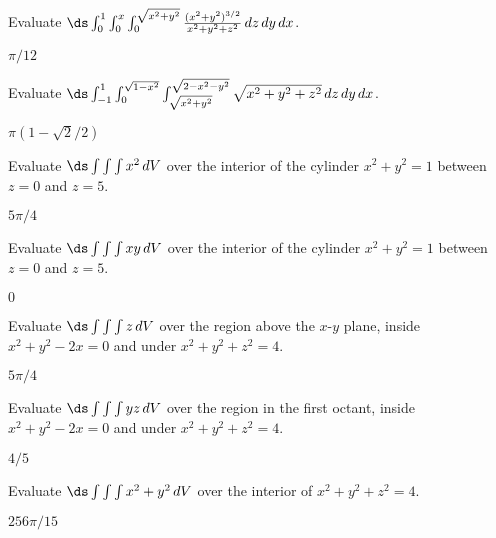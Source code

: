 \begin{exercises}

\begin{exercise} Evaluate $\ds\int_{0}^{1}\int_{0}^{x}\int_{0}^{\sqrt{x^2+y^2}}
{(x^2+y^2)^{3/2}\over x^2+y^2+z^2}\,dz\,dy\,dx$.
\begin{answer} $\pi/12$
\end{answer}\end{exercise}

\begin{exercise} Evaluate $\ds\int_{-1}^{1}\int_{0}^{\sqrt{1-x^2}}
\int_{\sqrt{x^2+y^2}}^{\sqrt{2-x^2-y^2}}\sqrt{x^2+y^2+z^2}\,dz\,dy\,dx$.
\begin{answer} $\pi(1-\sqrt2/2)$
\end{answer}\end{exercise}

\begin{exercise} Evaluate $\ds\int\int\int x^2\,dV$
over the interior of the cylinder $x^2+y^2=1$ between $z=0$ and $z=5$.
\begin{answer} $5\pi/4$
\end{answer}\end{exercise}

\begin{exercise} Evaluate $\ds\int\int\int xy\,dV$
over the interior of the cylinder $x^2+y^2=1$ between $z=0$ and $z=5$.
\begin{answer} $0$
\end{answer}\end{exercise}

\begin{exercise} Evaluate $\ds\int\int\int z\,dV$
over the region above the $x$-$y$ plane, inside $x^2+y^2-2x=0$ and
under $x^2+y^2+z^2=4$.
\begin{answer} $5\pi/4$
\end{answer}\end{exercise}

\begin{exercise} Evaluate $\ds\int\int\int yz\,dV$
over the region in the first octant, inside $x^2+y^2-2x=0$ and 
under $x^2+y^2+z^2=4$.
\begin{answer} $4/5$
\end{answer}\end{exercise}

\begin{exercise} Evaluate $\ds\int\int\int x^2+y^2\,dV$
over the interior of $x^2+y^2+z^2=4$.
\begin{answer} $256\pi/15$
\end{answer}\end{exercise}


\end{exercises}
